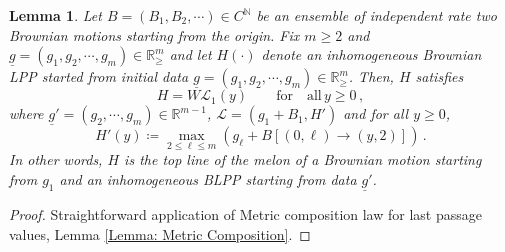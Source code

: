 \documentclass[11pt, reqno]{amsart}
\numberwithin{equation}{section}
\newcounter{dummy} \numberwithin{dummy}{section}
\newtheorem{lemma}[dummy]{Lemma}
\newcommand{\N}{\ensuremath{\mathbb{N}}}
\newcommand{\R}{\ensuremath{\mathbb{R}}}
\begin{document}
\begin{lemma}\label{lemma: iterated skorokhod}
    Let $B = (B_1, B_2, \cdots)\in C^{\N}$ be an ensemble of independent rate two Brownian motions starting from the origin. Fix $m\ge 2$ and $\underline{g}=(g_1,g_2,\cdots, g_m)\in\R^m_\ge$ and let $H(\cdot)$ denote an inhomogeneous Brownian LPP started from initial data $\underline{g}=(g_1,g_2,\cdots, g_m)\in\R^m_\ge$. Then, $H$ satisfies
    \[
    H = W\mathcal{L}_1(y)\qquad \mathrm{ for\quad all}\, y\ge 0\,,
    \]
    where $\underline{g}' = (g_2,\cdots, g_m)\in\R^{m-1}$, $\mathcal{L} = (g_1+B_1, H')$ and for all $y\ge 0$,
    \[
    H'(y) \coloneqq \displaystyle\max_{2\leq \ell\leq m}(g_\ell+B[(0,\ell)\to(y,2)]) \,.
    \] 
    In other words, $H$ is the top line of the melon of a Brownian motion starting from $g_1$ and an inhomogeneous BLPP starting from data $\underline{g}'$.
\end{lemma} 
\begin{proof}
    Straightforward application of Metric composition law for last passage values, Lemma \ref{Lemma: Metric Composition}.
\end{proof}
\end{document}
